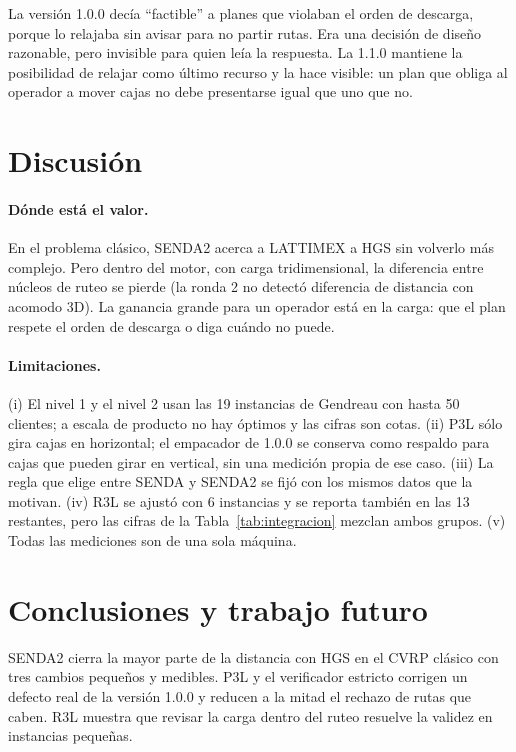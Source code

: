 \documentclass[11pt,a4paper]{article}
\newcommand{\senda}{SENDA}
\newcommand{\sendados}{SENDA2}
\begin{document}
\begin{leccion}
La versión 1.0.0 decía ``factible'' a planes que violaban el orden de descarga, porque lo relajaba sin
avisar para no partir rutas. Era una decisión de diseño razonable, pero invisible para quien leía la
respuesta. La 1.1.0 mantiene la posibilidad de relajar como último recurso y la hace visible: un plan
que obliga al operador a mover cajas no debe presentarse igual que uno que no.
\end{leccion}

\section{Discusión}
\label{sec:discusion}

\paragraph{Dónde está el valor.} En el problema clásico, \sendados{} acerca a LATTIMEX a HGS sin
volverlo más complejo. Pero dentro del motor, con carga tridimensional, la diferencia entre núcleos
de ruteo se pierde (la ronda 2 no detectó diferencia de distancia con acomodo 3D). La ganancia
grande para un operador está en la carga: que el plan respete el orden de descarga o diga cuándo no
puede.

\paragraph{Limitaciones.}
(i) El nivel 1 y el nivel 2 usan las 19 instancias de Gendreau con hasta 50 clientes; a escala de
producto no hay óptimos y las cifras son cotas.
(ii) P3L sólo gira cajas en horizontal; el empacador de 1.0.0 se conserva como respaldo para cajas que
pueden girar en vertical, sin una medición propia de ese caso.
(iii) La regla que elige entre \senda{} y \sendados{} se fijó con los mismos datos que la motivan.
(iv) R3L se ajustó con 6 instancias y se reporta también en las 13 restantes, pero las cifras de la
Tabla~\ref{tab:integracion} mezclan ambos grupos.
(v) Todas las mediciones son de una sola máquina.

\section{Conclusiones y trabajo futuro}

\sendados{} cierra la mayor parte de la distancia con HGS en el CVRP clásico con tres cambios
pequeños y medibles. P3L y el verificador estricto corrigen un defecto real de la versión 1.0.0 y
reducen a la mitad el rechazo de rutas que caben. R3L muestra que revisar la carga dentro del ruteo
resuelve la validez en instancias pequeñas.
\end{document}
